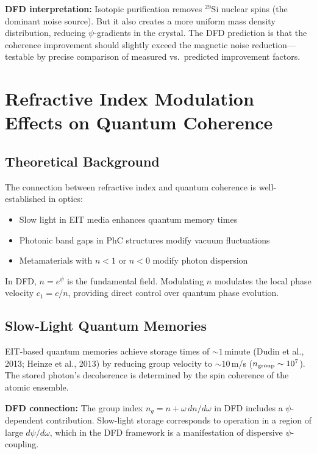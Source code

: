 \documentclass[11pt,letterpaper]{article}
\begin{document}
\textbf{DFD interpretation:} Isotopic purification removes $^{29}$Si
nuclear spins (the dominant noise source). But it also creates a more
uniform mass density distribution, reducing $\psi$-gradients in the
crystal. The DFD prediction is that the coherence improvement should
slightly exceed the magnetic noise reduction---testable by precise
comparison of measured vs.\ predicted improvement factors.

\section{Refractive Index Modulation Effects on Quantum Coherence}

\subsection{Theoretical Background}

The connection between refractive index and quantum coherence is
well-established in optics:
\begin{itemize}
\item Slow light in EIT media enhances quantum memory times
\item Photonic band gaps in PhC structures modify vacuum fluctuations
\item Metamaterials with $n < 1$ or $n < 0$ modify photon dispersion
\end{itemize}

In DFD, $n = e^\psi$ is the fundamental field. Modulating $n$ modulates
the local phase velocity $c_1 = c/n$, providing direct control over
quantum phase evolution.

\subsection{Slow-Light Quantum Memories}

EIT-based quantum memories achieve storage times of $\sim 1$\,minute
(Dudin et al., 2013; Heinze et al., 2013) by reducing group velocity to
$\sim 10$\,m/s ($n_{\rm group} \sim 10^7$). The stored photon's
decoherence is determined by the spin coherence of the atomic ensemble.

\textbf{DFD connection:} The group index $n_g = n + \omega\,dn/d\omega$
in DFD includes a $\psi$-dependent contribution. Slow-light storage
corresponds to operation in a region of large $d\psi/d\omega$, which in
the DFD framework is a manifestation of dispersive $\psi$-coupling.
\end{document}
